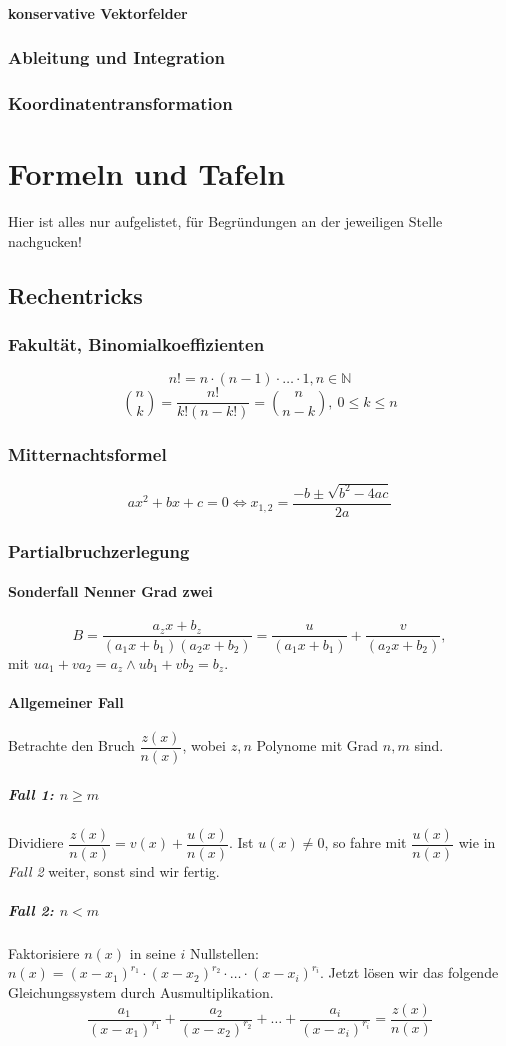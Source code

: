 \documentclass[a4paper, 9pt, DIV=24]{scrartcl}
\newcommand{\N}{\mathbb{N}}
\begin{document}
\paragraph{konservative Vektorfelder}

\subsubsection{Ableitung und Integration}

\subsubsection{Koordinatentransformation}

\clearpage
\section{Formeln und Tafeln}
Hier ist alles nur aufgelistet, für Begründungen an der jeweiligen Stelle nachgucken!
\subsection{Rechentricks}
\subsubsection{Fakultät, Binomialkoeffizienten}
\[ n! = n\cdot(n-1)\cdot\dots\cdot1, n\in\N \]
\[ \binom{n}{k} = \frac{n!}{k!(n-k!)} = \binom{n}{n-k},\ 0 \leq k \leq n \]

\subsubsection{Mitternachtsformel}
\[ ax^2 + bx + c = 0 \iff x_{1,2} = \frac{-b \pm \sqrt{b^2 - 4ac}}{2a} \]

\subsubsection{Partialbruchzerlegung}
\paragraph{Sonderfall Nenner Grad zwei}
\[
 B = \dfrac{a_zx+b_z}{(a_1x+b_1)(a_2x+b_2)} = \dfrac{u}{(a_1x+b_1)} + \dfrac{v}{(a_2x+b_2)},
\]
mit $ua_1 + va_2 = a_z \wedge ub_1 + vb_2 = b_z$.
\paragraph{Allgemeiner Fall}
Betrachte den Bruch $\dfrac{z(x)}{n(x)}$, wobei $z,n$ Polynome mit Grad $n,m$ sind.
\subparagraph{Fall 1: $n \geq m$}
Dividiere $\dfrac{z(x)}{n(x)} = v(x) + \dfrac{u(x)}{n(x)}$.
Ist $u(x) \neq 0$, so fahre mit $\dfrac{u(x)}{n(x)}$ wie in \emph{Fall 2} weiter, sonst sind wir fertig.
\subparagraph{Fall 2: $n < m$}
Faktorisiere $n(x)$ in seine $i$ Nullstellen: $n(x) = (x-x_1)^{r_1} \cdot (x-x_2)^{r_2} \cdot \dots \cdot (x-x_i)^{r_i}.$
Jetzt lösen wir das folgende Gleichungssystem durch Ausmultiplikation.
\[ \frac{a_1}{(x-x_1)^{r_1}} + \frac{a_2}{(x-x_2)^{r_2}} + \dots + \frac{a_i}{(x-x_i)^{r_i}} = \frac{z(x)}{n(x)} \]
\end{document}

